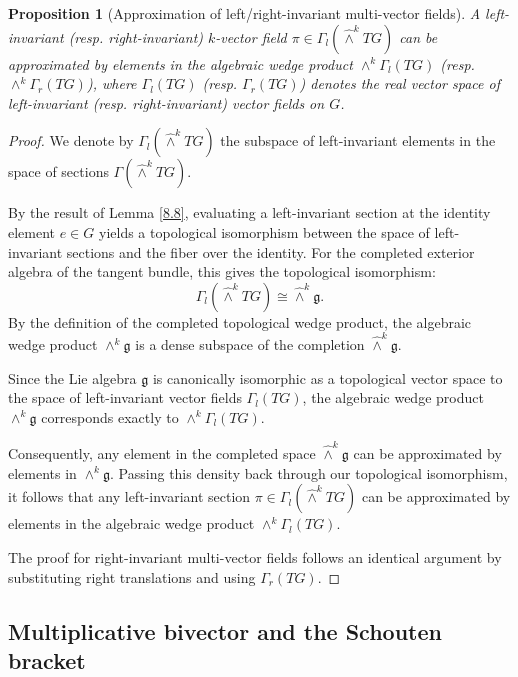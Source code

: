 \documentclass[11pt,reqno]{amsart}
\newtheorem{proposition}[theorem]{Proposition}
\theoremstyle{definition}
\numberwithin{equation}{section}
\begin{document}
\begin{proposition}[Approximation of left/right-invariant multi-vector fields]
A left-invariant (resp. right-invariant) $k$-vector field $\pi \in \Gamma_l(\hat{\wedge}^k TG)$ can be approximated by elements in the algebraic wedge product $\wedge^k \Gamma_l(TG)$ (resp. $\wedge^k \Gamma_r(TG)$), where $\Gamma_l(TG)$ (resp. $\Gamma_r(TG)$) denotes the real vector space of left-invariant (resp. right-invariant) vector fields on $G$.
\end{proposition}

\begin{proof}
We denote by $\Gamma_l(\hat{\wedge}^k TG)$ the subspace of left-invariant elements in the space of sections $\Gamma(\hat{\wedge}^k TG)$. 

By the result of Lemma \ref{8.8}, evaluating a left-invariant section at the identity element $e \in G$ yields a topological isomorphism between the space of left-invariant sections and the fiber over the identity. For the completed exterior algebra of the tangent bundle, this gives the topological isomorphism:
\[
\Gamma_l(\hat{\wedge}^k TG) \cong \hat{\wedge}^k \mathfrak{g}.
\]
By the definition of the completed topological wedge product, the algebraic wedge product $\wedge^k \mathfrak{g}$ is a dense subspace of the completion $\hat{\wedge}^k \mathfrak{g}$. 

Since the Lie algebra $\mathfrak{g}$ is canonically isomorphic as a topological vector space to the space of left-invariant vector fields $\Gamma_l(TG)$, the algebraic wedge product $\wedge^k \mathfrak{g}$ corresponds exactly to $\wedge^k \Gamma_l(TG)$. 

Consequently, any element in the completed space $\hat{\wedge}^k \mathfrak{g}$ can be approximated by elements in $\wedge^k \mathfrak{g}$. Passing this density back through our topological isomorphism, it follows that any left-invariant section $\pi \in \Gamma_l(\hat{\wedge}^k TG)$ can be approximated by elements in the algebraic wedge product $\wedge^k \Gamma_l(TG)$. 

The proof for right-invariant multi-vector fields follows an identical argument by substituting right translations and using $\Gamma_r(TG)$.
\end{proof}

\subsection{Multiplicative bivector and the Schouten bracket}
\end{document}
